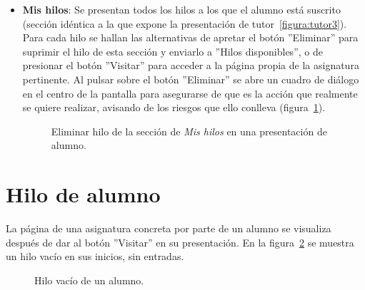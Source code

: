 \documentclass[a4paper, 12pt]{book}
\begin{document}
\begin{itemize}
  \item {\bfseries Mis hilos}: Se presentan todos los hilos a los que el alumno est\'a suscrito (secci\'on id\'entica a la que expone la presentaci\'on de 
  tutor~\ref{figura:tutor3}). Para cada hilo se hallan las alternativas de apretar el bot\'on ''Eliminar'' para suprimir el hilo de esta secci\'on y 
  enviarlo a ''Hilos disponibles'', o de presionar el bot\'on ''Visitar'' para acceder a la p\'agina propia de la asignatura pertinente. Al pulsar sobre el 
  bot\'on ''Eliminar'' se abre un cuadro de di\'alogo en el centro de la pantalla para asegurarse de que es la acci\'on que realmente se quiere realizar, 
  avisando de los riesgos que ello conlleva (figura~\ref{figura:alumno3}).
  \begin{figure}[htbp] 
    \centering
    \caption{Eliminar hilo de la secci\'on de \textit{Mis hilos} en una presentaci\'on de alumno.}
    \label{figura:alumno3}
  \end{figure}
\end{itemize} 


\section{Hilo de alumno}
\label{app:hiloalumno}
La p\'agina de una asignatura concreta por parte de un alumno se visualiza despu\'es de dar al bot\'on ''Visitar'' en su presentaci\'on. En la 
figura~\ref{figura:hiloalumno} se muestra un hilo vac\'io en sus inicios, sin entradas.
\begin{figure}[htbp] 
  \centering
  \caption{Hilo vac\'io de un alumno.}
  \label{figura:hiloalumno}
\end{figure}
\end{document}

